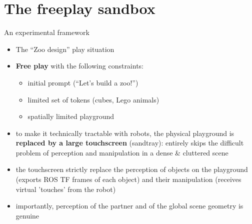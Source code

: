 \documentclass[xcolor=table]{beamer}
\begin{document}

\section{The freeplay sandbox}


\begin{frame}{An experimental framework}

    \begin{itemize}
        \item The ``Zoo design'' play situation
        \item {\bf Free play} with the following constraints:
            \begin{itemize}
                \item initial prompt (``Let's build a zoo!'')
                \item limited set of tokens (cubes, Lego animals)
                \item spatially limited playground
            \end{itemize}
        \item<2-> to make it technically tractable with robots, the physical
            playground is {\bf replaced by a large touchscreen} (sandtray): entirely
            skips the difficult problem of perception and manipulation in a
            dense \& cluttered scene
        \item<2-> the touchscreen strictly
            replace the perception of objects on the playground (exports
            ROS TF frames of each object) and their manipulation (receives
            virtual 'touches' from the robot)
        \item<2-> importantly, perception of the partner and of the global scene
            geometry is genuine
    \end{itemize}
\end{frame}





\end{document}
